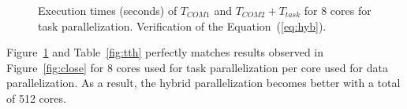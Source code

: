 \begin{figure}[!h]\begin{center}
  \caption{Execution times (seconds) of $T_{COM1}$ and $T_{COM2} + T_{task}$ for 8 cores for task parallelization. Verification of the Equation~(\ref{eq:hyb}).}
  \label{fig:tth2}
\end{center}\end{figure}

Figure~\ref{fig:tth2} and Table~\ref{fig:tth} perfectly matches results observed in Figure~\ref{fig:close} for 8 cores used for task parallelization per core used for data parallelization. As a result, the hybrid parallelization becomes better with a total of 512 cores.
